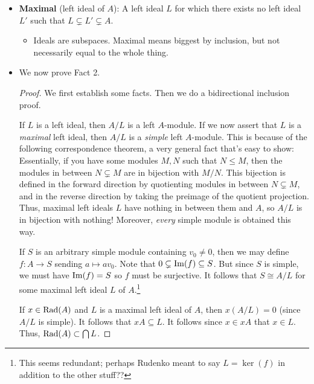\documentclass[../notes.tex]{subfiles}
\begin{document}
\begin{itemize}
    \item \textbf{Maximal} (left ideal of $A$): A left ideal $L$ for which there exists no left ideal $L'$ such that $L\subsetneq L'\subsetneq A$.
    \begin{itemize}
        \item Ideals are subspaces. Maximal means biggest by inclusion, but not necessarily equal to the whole thing.
    \end{itemize}
    \item We now prove Fact 2.
    \begin{proof}
        We first establish some facts. Then we do a bidirectional inclusion proof.\par\smallskip
        If $L$ is a left ideal, then $A/L$ is a left $A$-module. If we now assert that $L$ is a \emph{maximal} left ideal, then $A/L$ is a \emph{simple} left $A$-module. This is because of the following correspondence theorem, a very general fact that's easy to show: Essentially, if you have some modules $M,N$ such that $N\leq M$, then the modules in between $N\subsetneq M$ are in bijection with $M/N$. This bijection is defined in the forward direction by quotienting modules in between $N\subsetneq M$, and in the reverse direction by taking the preimage of the quotient projection. Thus, maximal left ideals $L$ have nothing in between them and $A$, so $A/L$ is in bijection with nothing! Moreover, \emph{every} simple module is obtained this way.\par
        If $S$ is an arbitrary simple module containing $v_0\neq 0$, then we may define $f:A\to S$ sending $a\mapsto av_0$. Note that $0\subsetneq\operatorname{Im}(f)\subseteq S$. But since $S$ is simple, we must have $\operatorname{Im}(f)=S$ so $f$ must be surjective. It follows that $S\cong A/L$ for some maximal left ideal $L$ of $A$.\footnote{This seems redundant; perhaps Rudenko meant to say $L=\ker(f)$ in addition to the other stuff??}\par\smallskip
        If $x\in\operatorname{Rad}(A)$ and $L$ is a maximal left ideal of $A$, then $x(A/L)=0$ (since $A/L$ is simple). It follows that $xA\subseteq L$. It follows since $x\in xA$ that $x\in L$. Thus, $\operatorname{Rad}(A)\subset\bigcap L$.\par

\end{proof}
\end{itemize}
\end{document}
